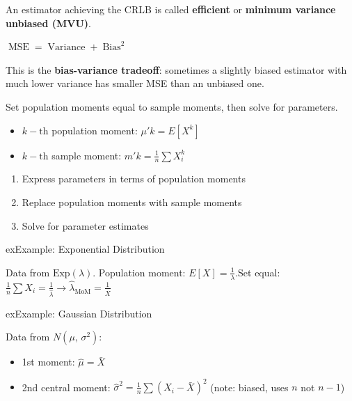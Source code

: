 An estimator achieving the CRLB is called \textbf{efficient} or \textbf{minimum variance unbiased (MVU)}.



\textbf{$\operatorname{MSE} = \operatorname{Variance} + \operatorname{Bias}^{2}$}

This is the \textbf{bias-variance tradeoff}: sometimes a slightly biased estimator with much lower variance has smaller MSE than an unbiased one.



Set population moments equal to sample moments, then solve for parameters.

\begin{itemize}
\tightlist
\item
  $k-\mathrm{th}$ population moment: $\mu 'k = E[X^{k}]$
\item
  $k-\mathrm{th}$ sample moment: $m'k = \frac{1}{n}\sum X_{i}^{k}$
\end{itemize}


\begin{enumerate}
\def\labelenumi{\arabic{enumi}.}
\tightlist
\item
  Express parameters in terms of population moments
\item
  Replace population moments with sample moments
\item
  Solve for parameter estimates
\end{enumerate}

\begin{PSbox}[unbreakable]{ex}{Example: Exponential Distribution}

Data from $\mathrm{Exp}(\lambda)$. Population moment: $E[X] = \frac{1}{\lambda}$.\PSbr{}Set equal: $\frac{1}{n}\sum X_{i} = \frac{1}{\hat{\lambda}} \to \hat{\lambda}_{\mathrm{MoM}} = \frac{1}{\bar{X}}$

\end{PSbox}

\begin{PSbox}[unbreakable]{ex}{Example: Gaussian Distribution}

Data from $N(\mu,\, \sigma^{2})$:

\begin{itemize}
\tightlist
\item
  1st moment: $\hat{\mu} = \bar{X}$
\item
  2nd central moment: $\hat{\sigma}^{2} = \frac{1}{n}\sum (X_{i} - \bar{X})^{2}$ (note: biased, uses $n$ not $n-1$)
\end{itemize}

\end{PSbox}


